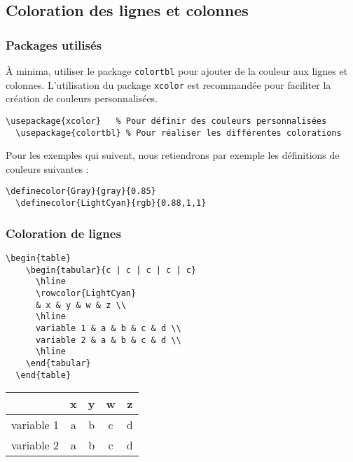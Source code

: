 \subsection{Coloration des lignes et colonnes}
\subsubsection{Packages utilisés}
À minima, utiliser le package \texttt{colortbl} pour ajouter de la couleur aux lignes et colonnes. L'utilisation du package \texttt{xcolor} est recommandée pour faciliter la création de couleurs personnalisées.

\begin{lstlisting}[language={[LaTeX]TeX}]
  \usepackage{xcolor}   % Pour définir des couleurs personnalisées
  \usepackage{colortbl} % Pour réaliser les différentes colorations
\end{lstlisting}

Pour les exemples qui suivent, nous retiendrons par exemple les définitions de couleurs suivantes :

\begin{lstlisting}[language={[LaTeX]TeX}]
  \definecolor{Gray}{gray}{0.85}
  \definecolor{LightCyan}{rgb}{0.88,1,1}
\end{lstlisting}

\subsubsection{Coloration de lignes}
\noindent
\begin{minipage}{.65\textwidth}
\begin{lstlisting}[language={[LaTeX]TeX}]
  \begin{table}
    \begin{tabular}{c | c | c | c | c}
      \hline
      \rowcolor{LightCyan}
      & x & y & w & z \\
      \hline
      variable 1 & a & b & c & d \\
      variable 2 & a & b & c & d \\
      \hline
    \end{tabular}
  \end{table}
\end{lstlisting}
\end{minipage}%
\hfill%
\begin{tabular}{c | c | c | c | c}
  \hline
  \rowcolor{LightCyan}
  & x & y & w & z \\
  \hline
  variable 1 & a & b & c & d \\
  variable 2 & a & b & c & d \\ \hline
\end{tabular}
\hfill\rule{0pt}{0pt}

